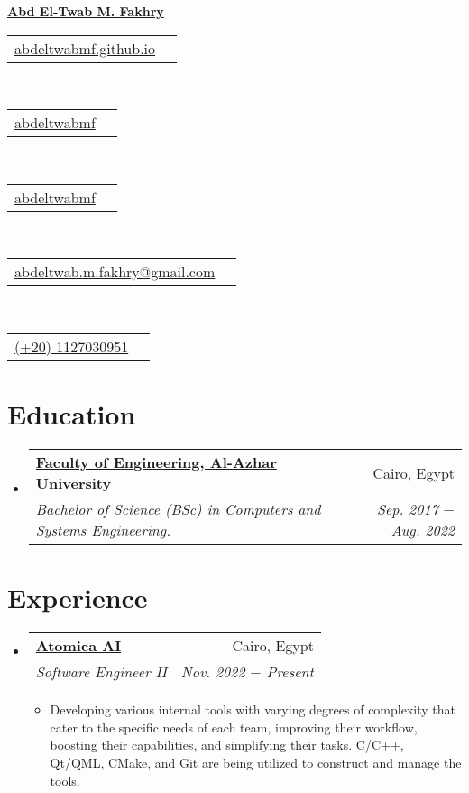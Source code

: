 \documentclass[letterpaper, 11pt]{article}
\makeatletter
\newcommand{\education}[6] {
	\vspace{-1pt}\item[]
  \begin{tabular*}{1\textwidth}[t]{l@{\extracolsep{\fill}}r}
		#1 \href{#2}{\textbf{\color{RoyalBlue}#3}} & #4 \\
    \textit{\small #5} & \textit{\small #6} \\
  \end{tabular*}
  \vspace{-4pt}
}
\newcommand{\experience}[6] {
	\vspace{-1pt}\item[]
  \begin{tabular*}{1\textwidth}[t]{l@{\extracolsep{\fill}}r}
		#1 \href{#2}{\textbf{\color{RoyalBlue}#3}} & #4 \\
    \textit{\small #5} & \textit{\small #6} \\
  \end{tabular*}
  \vspace{-8pt}
}
\newcommand{\subexperience}[1] {
\item\small
  {#1}
  \vspace{-2pt}
}
\newcommand{\name}[2] {
  \textbf{
    \href{#1}{\Huge{#2}}
  }
  \vspace{-4pt}
}
\newcommand{\contact}[4] {
  \begin{tabular}{lr}
    {\href{#1}{\color{#3} #2 #4}}
  \end{tabular}
  \vspace{-4pt}
}
\makeatother
\begin{document}
\name{https://abdeltwabmf.github.io}{Abd El-Twab M. Fakhry}

\begin{center}
  \small
  \contact
  {https://abdeltwabmf.github.io}
  {\faIcon{globe}}{RoyalBlue}{abdeltwabmf.github.io}\,
  \contact
  {https://www.linkedin.com/in/abdeltwabmf}
  {\faIcon{linkedin}}{RoyalBlue}{abdeltwabmf}\,
  \contact
  {https://github.com/AbdeltwabMF}
  {\faIcon{github}}{RoyalBlue}{abdeltwabmf}\,
  \contact
  {mailto:abdeltwab.m.fakhry@gmail.com}
  {\faIcon{envelope}}{RoyalBlue}{abdeltwab.m.fakhry@gmail.com}\,
  \contact
  {tel:+201127030951}
  {\faIcon{mobile-alt}}{RoyalBlue}{(+20) 1127030951}
\end{center}\vspace{8pt}

\section{Education}
\begin{itemize}[leftmargin=0pt]
  \education
  {\faIcon{university}}
	{https://eng-azhar.net/}
  {Faculty of Engineering, Al-Azhar University}{ Cairo, Egypt}
  {Bachelor of Science (BSc) in Computers and Systems Engineering.}{Sep. 2017 $-$ Aug. 2022}
\end{itemize}

\section{Experience}
\begin{itemize}[leftmargin=0pt]
  \experience
	{\faIcon{briefcase}}
  {https://atomica.ai/}{Atomica AI}{Cairo, Egypt}
  {Software Engineer II}{Nov. 2022 $-$ Present}

  \begin{itemize}
    \subexperience
    {Developing various internal tools with varying degrees of complexity that cater to the specific needs of each team, improving their workflow, boosting their capabilities, and simplifying their tasks. C/C++, Qt/QML, CMake, and Git are being utilized to construct and manage the tools.}
  \end{itemize}\vspace{-4pt}
\end{itemize}

\end{document}

